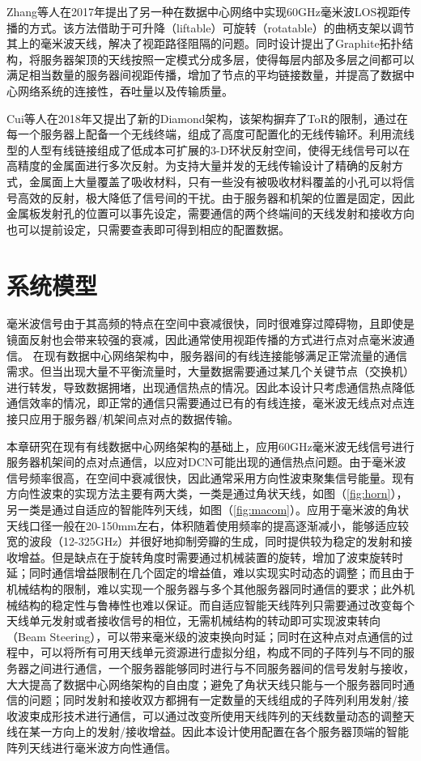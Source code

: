 Zhang等人在2017年提出了另一种在数据中心网络中实现60GHz毫米波LOS视距传播的方式\cite{zhang2017free}。该方法借助于可升降（liftable）可旋转（rotatable）的曲柄支架以调节其上的毫米波天线，解决了视距路径阻隔的问题。同时设计提出了Graphite拓扑结构，将服务器架顶的天线按照一定模式分成多层，使得每层内部及多层之间都可以满足相当数量的服务器间视距传播，增加了节点的平均链接数量，并提高了数据中心网络系统的连接性，吞吐量以及传输质量。

Cui等人在2018年又提出了新的Diamond架构\cite{cui2018diamond}，该架构摒弃了ToR的限制，通过在每一个服务器上配备一个无线终端，组成了高度可配置化的无线传输环。利用流线型的人型有线链接组成了低成本可扩展的3-D环状反射空间，使得无线信号可以在高精度的金属面进行多次反射。为支持大量并发的无线传输设计了精确的反射方式，金属面上大量覆盖了吸收材料，只有一些没有被吸收材料覆盖的小孔可以将信号高效的反射，极大降低了信号间的干扰。由于服务器和机架的位置是固定，因此金属板发射孔的位置可以事先设定，需要通信的两个终端间的天线发射和接收方向也可以提前设定，只需要查表即可得到相应的配置数据。

\section{系统模型}

毫米波信号由于其高频的特点在空间中衰减很快，同时很难穿过障碍物，且即使是镜面反射也会带来较强的衰减，因此通常使用视距传播的方式进行点对点毫米波通信。
在现有数据中心网络架构中，服务器间的有线连接能够满足正常流量的通信需求。但当出现大量不平衡流量时，大量数据需要通过某几个关键节点（交换机）进行转发，导致数据拥堵，出现通信热点的情况。因此本设计只考虑通信热点降低通信效率的情况，即正常的通信只需要通过已有的有线连接，毫米波无线点对点连接只应用于服务器/机架间点对点的数据传输。

本章研究在现有有线数据中心网络架构的基础上，应用60GHz毫米波无线信号进行服务器机架间的点对点通信，以应对DCN可能出现的通信热点问题。由于毫米波信号频率很高，在空间中衰减很快，因此通常采用方向性波束聚集信号能量。现有方向性波束的实现方法主要有两大类，一类是通过角状天线，如图（\ref{fig:horn}），另一类是通过自适应的智能阵列天线，如图（\ref{fig:macom}）。应用于毫米波的角状天线口径一般在20-150mm左右，体积随着使用频率的提高逐渐减小，能够适应较宽的波段（12-325GHz）并很好地抑制旁瓣的生成，同时提供较为稳定的发射和接收增益。但是缺点在于旋转角度时需要通过机械装置的旋转，增加了波束旋转时延；同时通信增益限制在几个固定的增益值，难以实现实时动态的调整；而且由于机械结构的限制，难以实现一个服务器与多个其他服务器同时通信的要求；此外机械结构的稳定性与鲁棒性也难以保证。而自适应智能天线阵列只需要通过改变每个天线单元发射或者接收信号的相位，无需机械结构的转动即可实现波束转向（Beam Steering），可以带来毫米级的波束换向时延；同时在这种点对点通信的过程中，可以将所有可用天线单元资源进行虚拟分组，构成不同的子阵列与不同的服务器之间进行通信，一个服务器能够同时进行与不同服务器间的信号发射与接收，大大提高了数据中心网络架构的自由度；避免了角状天线只能与一个服务器同时通信的问题；同时发射和接收双方都拥有一定数量的天线组成的子阵列利用发射/接收波束成形技术进行通信，可以通过改变所使用天线阵列的天线数量动态的调整天线在某一方向上的发射/接收增益。因此本设计使用配置在各个服务器顶端的智能阵列天线进行毫米波方向性通信。

